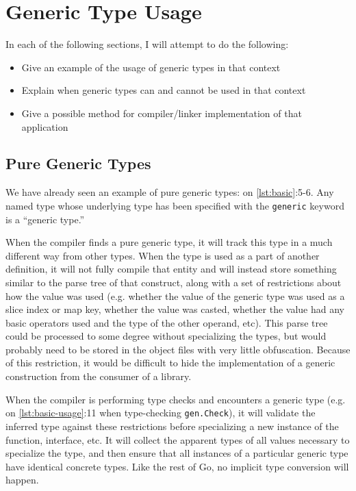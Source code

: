 \documentclass[10pt,a4paper]{article}
\newcommand{\code}[1]{\texttt{#1}}
\newcommand{\Listing}[1]{\autoref{lst:#1}}
\begin{document}
\newpage
\section{Generic Type Usage}
In each of the following sections, I will attempt to do the following:
\begin{itemize}
\item Give an example of the usage of generic types in that context
\item Explain when generic types can and cannot be used in that context
\item Give a possible method for compiler/linker implementation of that application
\end{itemize}

\subsection{Pure Generic Types}
We have already seen an example of pure generic types: on \Listing{basic}:5-6.  Any named type whose underlying type has been specified with the \code{generic} keyword is a ``generic type.''

When the compiler finds a pure generic type, it will track this type in a much different way from other types.  When the type is used as a part of another definition, it will not fully compile that entity and will instead store something similar to the parse tree of that construct, along with a set of restrictions about how the value was used (e.g. whether the value of the generic type was used as a slice index or map key, whether the value was casted, whether the value had any basic operators used and the type of the other operand, etc).  This parse tree could be processed to some degree without specializing the types, but would probably need to be stored in the object files with very little obfuscation.  Because of this restriction, it would be difficult to hide the implementation of a generic construction from the consumer of a library.

When the compiler is performing type checks and encounters a generic type (e.g. on \Listing{basic-usage}:11 when type-checking \code{gen.Check}), it will validate the inferred type against these restrictions before specializing a new instance of the function, interface, etc.  It will collect the apparent types of all values necessary to specialize the type, and then ensure that all instances of a particular generic type have identical concrete types.  Like the rest of Go, no implicit type conversion will happen.
\end{document}
